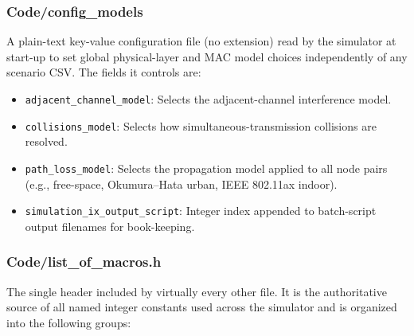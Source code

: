 \documentclass[11pt,a4paper]{article}
\begin{document}
\subsubsection{Code/config\_models}

A plain-text key-value configuration file (no extension) read by the simulator at start-up to set global physical-layer and MAC model choices independently of any scenario CSV. The fields it controls are:

\begin{itemize}
    \item \texttt{adjacent\_channel\_model}: Selects the adjacent-channel interference model.
    \item \texttt{collisions\_model}: Selects how simultaneous-transmission collisions are resolved.
    \item \texttt{path\_loss\_model}: Selects the propagation model applied to all node pairs (e.g., free-space, Okumura--Hata urban, IEEE 802.11ax indoor).
    \item \texttt{simulation\_ix\_output\_script}: Integer index appended to batch-script output filenames for book-keeping.
\end{itemize}

\subsubsection{Code/list\_of\_macros.h}

The single header included by virtually every other file. It is the authoritative source of all named integer constants used across the simulator and is organized into the following groups:
\end{document}
